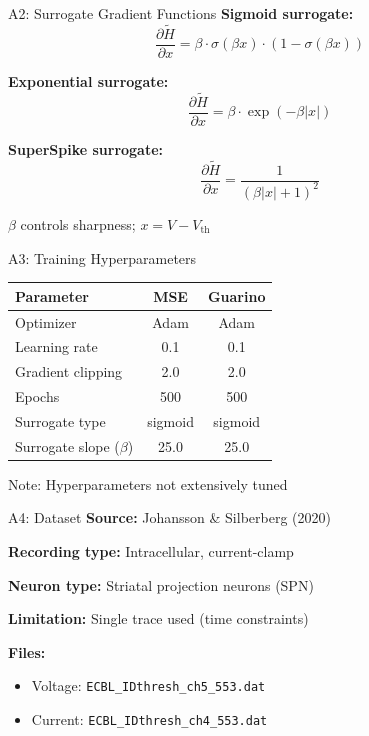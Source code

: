 \documentclass[17pt, t, lualatex]{beamer}
\begin{document}
\begin{frame}{A2: Surrogate Gradient Functions}
\textbf{Sigmoid surrogate:}
\[
\frac{\partial \tilde{H}}{\partial x} = \beta \cdot \sigma(\beta x) \cdot (1 - \sigma(\beta x))
\]

\textbf{Exponential surrogate:}
\[
\frac{\partial \tilde{H}}{\partial x} = \beta \cdot \exp(-\beta |x|)
\]

\textbf{SuperSpike surrogate:}
\[
\frac{\partial \tilde{H}}{\partial x} = \frac{1}{(\beta |x| + 1)^2}
\]

\vspace{0.5cm}
$\beta$ controls sharpness; $x = V - V_{\text{th}}$
\end{frame}

\begin{frame}{A3: Training Hyperparameters}
\begin{table}
\centering
\small
\begin{tabular}{lcc}
\toprule
\textbf{Parameter} & \textbf{MSE} & \textbf{Guarino} \\
\midrule
Optimizer & Adam & Adam \\
Learning rate & 0.1 & 0.1 \\
Gradient clipping & 2.0 & 2.0 \\
Epochs & 500 & 500 \\
Surrogate type & sigmoid & sigmoid \\
Surrogate slope ($\beta$) & 25.0 & 25.0 \\
\bottomrule
\end{tabular}
\end{table}

\vspace{0.5cm}
\small Note: Hyperparameters not extensively tuned
\end{frame}

\begin{frame}{A4: Dataset}
\textbf{Source:} Johansson \& Silberberg (2020)

\vspace{0.5cm}
\textbf{Recording type:} Intracellular, current-clamp

\vspace{0.5cm}
\textbf{Neuron type:} Striatal projection neurons (SPN)

\vspace{0.5cm}
\textbf{Limitation:} Single trace used (time constraints)

\vspace{0.5cm}
\textbf{Files:}
\begin{itemize}
    \item Voltage: \texttt{ECBL\_IDthresh\_ch5\_553.dat}
    \item Current: \texttt{ECBL\_IDthresh\_ch4\_553.dat}
\end{itemize}
\end{frame}
\end{document}
